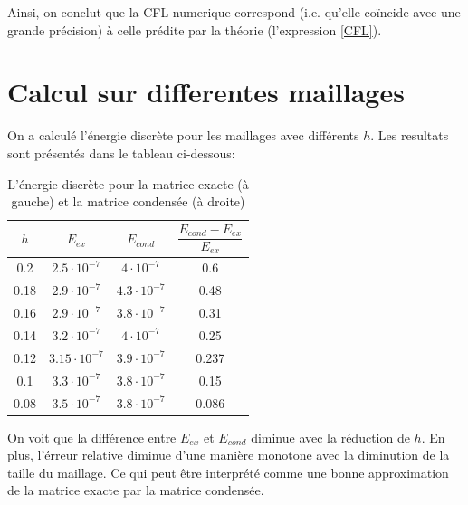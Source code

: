\documentclass[12pt]{article}
\begin{document}
Ainsi, on conclut que la CFL numerique correspond (i.e. qu'elle coïncide avec une grande précision) à celle prédite par la théorie (l'expression \eqref{CFL}).

\section{Calcul sur differentes maillages}
On a calculé l'énergie discrète pour les maillages avec différents $h$. Les resultats sont présentés dans le tableau ci-dessous:
	\begin{table}[H] 
	\begin{center}
		\begin{tabular}{|c|c|c|c|}
			\hline
			$h$ & $E_{ex}$ & $E_{cond}$ & $\dfrac{E_{cond} - E_{ex}}{E_{ex}}$\\
			\hline
			0.2 & $2.5 \cdot 10^{-7}$ & $4 \cdot 10^{-7}$ & 0.6 \\ 
			0.18 & $2.9 \cdot 10^{-7}$ & $4.3 \cdot 10^{-7}$ & 0.48 \\
			0.16 & $2.9 \cdot 10^{-7}$ & $3.8 \cdot 10^{-7}$ & 0.31\\
			0.14 & $3.2 \cdot 10^{-7}$ & $4 \cdot 10^{-7}$ & 0.25 \\
			0.12 & $3.15 \cdot 10^{-7}$ & $3.9 \cdot 10^{-7}$ & 0.237\\
			0.1 & $3.3 \cdot 10^{-7}$ & $3.8 \cdot 10^{-7}$  & 0.15\\
			0.08 & $3.5 \cdot 10^{-7}$ & $3.8 \cdot 10^{-7}$ & 0.086 \\
			\hline
		\end{tabular}
	\end{center}
\caption{\label{tab:energie} L'énergie discrète pour la matrice exacte (à gauche) et la matrice condensée (à droite)}
\end{table} 
On voit que la différence entre $E_{ex}$ et $E_{cond}$ diminue avec la réduction de $h$. En plus, l'érreur relative diminue d'une manière monotone avec la diminution de la taille du maillage. Ce qui peut être interprété comme une bonne approximation de la matrice exacte par la matrice condensée.
\end{document}
